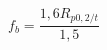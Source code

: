 \documentclass[12pt]{article}
\begin{document}
\begin{displaymath}
f_b= \frac {1,6R_{p0,2/t}} {1,5}
\end{displaymath}
\end{document}
